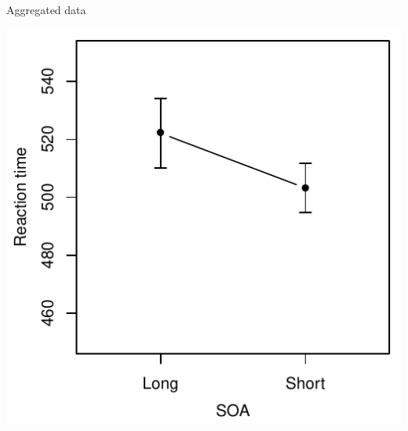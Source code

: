 \documentclass[aspectratio=169]{beamer}
\begin{document}
\begin{frame}{Aggregated data}
  \begin{center}
    \includegraphics[scale=.8]{../figures/baayen_ex_agg}
  \end{center}
\end{frame}
\end{document}
